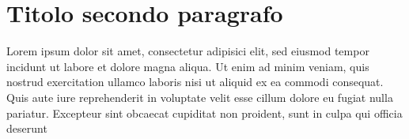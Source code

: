 \section{Titolo secondo paragrafo}

Lorem ipsum dolor sit amet, consectetur adipisici elit, sed eiusmod tempor incidunt ut labore et dolore magna aliqua. 
Ut enim ad minim veniam, quis nostrud exercitation ullamco laboris nisi ut aliquid ex ea commodi consequat. Quis aute iure reprehenderit in voluptate velit esse cillum dolore eu fugiat nulla pariatur. Excepteur sint obcaecat cupiditat non proident, sunt in culpa qui officia deserunt 

                